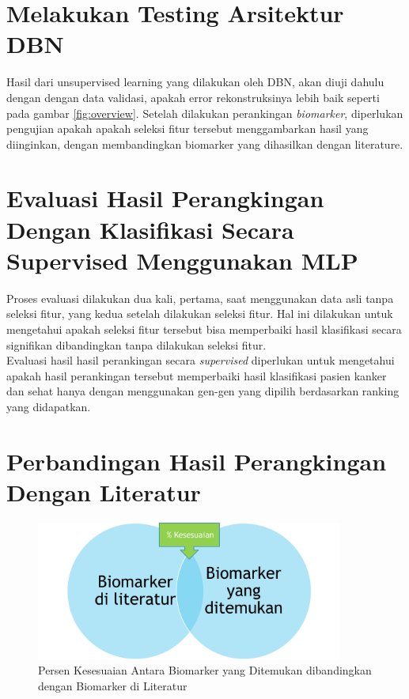 \section{Melakukan Testing Arsitektur DBN}
Hasil dari unsupervised learning yang dilakukan oleh DBN, akan diuji dahulu dengan dengan data validasi, apakah error rekonstruksinya lebih baik seperti pada gambar \ref{fig:overview}. Setelah dilakukan perankingan \textit{biomarker}, diperlukan pengujian apakah apakah seleksi fitur tersebut menggambarkan hasil yang diinginkan, dengan membandingkan biomarker yang dihasilkan dengan literature. 



\section{Evaluasi Hasil Perangkingan Dengan Klasifikasi Secara Supervised Menggunakan MLP}

Proses evaluasi dilakukan dua kali, pertama, saat menggunakan data asli tanpa seleksi fitur, yang kedua setelah dilakukan seleksi fitur. Hal ini dilakukan untuk mengetahui apakah seleksi fitur tersebut bisa memperbaiki hasil klasifikasi secara signifikan dibandingkan tanpa dilakukan seleksi fitur. \\
Evaluasi hasil hasil perankingan secara \textit{supervised} diperlukan untuk mengetahui apakah hasil perankingan tersebut memperbaiki hasil klasifikasi pasien kanker dan sehat hanya dengan menggunakan gen-gen yang dipilih berdasarkan ranking yang didapatkan.


\section{Perbandingan Hasil Perangkingan Dengan Literatur}
\begin{figure}
	\centering
	\includegraphics[width=0.9\textwidth]
		{pics/biomarker1.png}
	\caption{Persen Kesesuaian Antara Biomarker yang Ditemukan dibandingkan dengan Biomarker di Literatur}
	\label{fig:biomarker1}
\end{figure}

